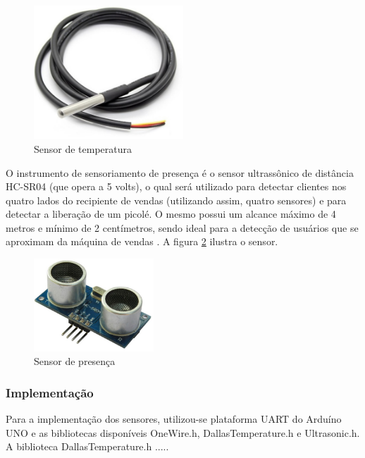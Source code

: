\begin{figure}[H]
	\centering
    \includegraphics[width=0.5\textwidth]{figuras/sensor_temperatura}
    \caption{Sensor de temperatura}
    \label{fig:sensor_temperatura}
\end{figure}

O instrumento de sensoriamento de presença é o sensor ultrassônico de distância HC-SR04 (que opera a 5 volts), o qual será utilizado para detectar clientes nos quatro lados do recipiente de vendas (utilizando assim, quatro sensores) e para detectar a liberação de um picolé. O mesmo possui um alcance máximo de 4 metros e mínimo de 2 centímetros, sendo ideal para a detecção de usuários que se aproximam da máquina de vendas \cite{mq3}. A figura \ref{fig:sensor_presenca} ilustra o sensor.

\begin{figure}[H]
	\centering
    \includegraphics[width=0.4\textwidth]{figuras/sensor_presenca}
    \caption{Sensor de presença}
    \label{fig:sensor_presenca}
\end{figure}

\subsubsection{Implementação}

Para a implementação dos sensores, utilizou-se plataforma UART do Arduíno UNO e as bibliotecas disponíveis OneWire.h, DallasTemperature.h e Ultrasonic.h. A biblioteca DallasTemperature.h ..... 

